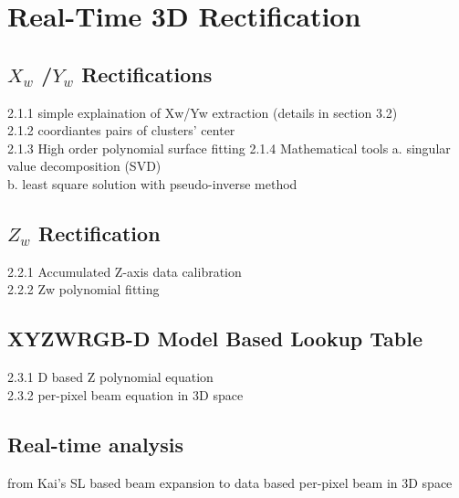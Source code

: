 %
\chapter{Real-Time 3D Rectification} %
\label{sens_Rectification} %

\section{\(X_{w}\) /\(Y_{w}\) Rectifications}

2.1.1 simple explaination of Xw/Yw extraction (details in section 3.2)\\
2.1.2 coordiantes pairs of clusters' center\\
2.1.3 High order polynomial surface fitting
2.1.4 Mathematical tools
a. singular value decomposition (SVD)\\
b. least square solution with pseudo-inverse method

\section{\(Z_{w}\) Rectification}

2.2.1 Accumulated Z-axis data calibration\\
2.2.2 Zw polynomial fitting



\section{XYZWRGB-D Model Based Lookup Table}
2.3.1  D based Z polynomial equation\\
2.3.2 per-pixel beam equation in 3D space



\section{Real-time analysis}
from Kai's SL based beam expansion to data based per-pixel beam in 3D space



